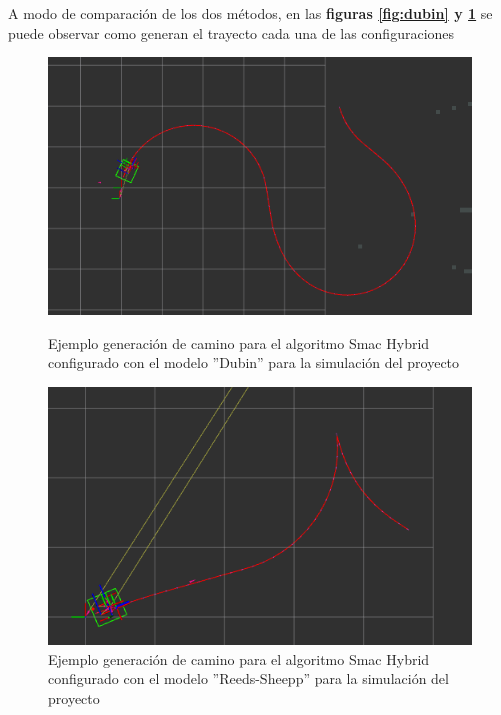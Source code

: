 A modo de comparación de los dos métodos, en las \textbf{figuras \ref{fig:dubin} y \ref{fig:reedshep}} se puede observar como generan el trayecto cada una de las configuraciones
\begin{figure}[htbp]
  \centering
  \begin{minipage}[b]{0.45\textwidth}
    \centering
    \includegraphics[width=\textwidth]{images/dubin_test.png}
    \caption{Ejemplo generación de camino para el algoritmo Smac Hybrid configurado con el modelo ''Dubin'' para la simulación del proyecto}
    \label{fig:dubin}
  \end{minipage}
  \hfill
  \begin{minipage}[b]{0.45\textwidth}
    \centering
    \includegraphics[width=\textwidth]{images/reed_sheep_test.png}
    \caption{Ejemplo generación de camino para el algoritmo Smac Hybrid configurado con el modelo ''Reeds-Sheepp'' para la simulación del proyecto}
    \label{fig:reedshep}
  \end{minipage}
\end{figure}


